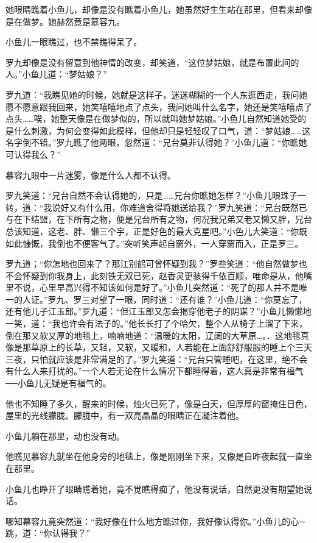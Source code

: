 \documentclass[12pt,oneside]{book}
\begin{document}
她眼睛瞧着小鱼儿，却像是没有瞧着小鱼儿，她虽然好生生站在那里，但看来却像是在做梦。她赫然竟是慕容九。

小鱼儿一眼瞧过，也不禁瞧得呆了。

罗九却像是没有留意到他神情的改变，却笑道，``这位梦姑娘，就是布置此间的人。''小鱼儿道：``梦姑娘？''

罗九道：``我瞧见她的时候，她就是这样子，迷迷糊糊的一个人东逛西走，我问她愿不愿意跟我回来，她笑嘻嘻地点了点头，我问她叫什么名字，她还是笑嘻嘻点了点头\ldots\ldots 唉，她整天像是在做梦似的，所以就叫她梦姑娘。''小鱼儿自然知道她受的是什么刺激，为何会变得如此模样，但他却只是轻轻叹了口气，道：``梦姑娘\ldots\ldots 这名字倒不错。''罗九瞧了他两眼，忽然道：``兄台莫非认得她？''小鱼儿道：``你瞧她可认得我么？''

慕容九眼中一片迷雾，像是什么人都不认得。

罗九笑道：``兄台自然不会认得她的，只是\ldots\ldots 兄台你瞧她怎样？''小鱼儿眼珠子一转，道：``我说好又有什么用，你难道舍得将她送给我？''罗九笑道：``兄台既然已与在下结盟，在下所有之物，便是兄台所有之物，何况我兄弟又老又懒又胖，兄台总该知道，这老、胖、懒三个宇，正是好色的最大克星吧。''小色儿大笑道：``你既如此慷慨，我倒也不便客气了。''突听笑声起自窗外，一人穿窗而入，正是罗三。

罗九道；``你怎地也回来了？那江别鹤可曾怀疑到我？''罗叁笑道：``他自然做梦也不会怀疑到你我身上，此刻铁无双已死，赵香灵更骇得千依百顺，唯命是从，他嘴里不说，心里早高兴得不知该如何是好了。''小鱼儿突然道：``死了的那人并不是唯一的人证。''罗九、罗三对望了一眼，同时道：``还有谁？''小鱼儿道：``你莫忘了，还有他儿子江玉郎。''罗九道：``但江玉郎又怎会揭穿他老子的阴谋？''小鱼儿懒懒地一笑，道：``我也许会有法子的。''他长长打了个哈欠，整个人从椅子上溜了下来，倒在那又软又厚的地毯上，喃喃地道：``温暖的太阳，辽阔的大草原\ldots。．这地毯真像是那草原上的长草，又轻，又软，又暖和，人若能在上面舒舒服服的睡上个三天三夜，只怕就应该是非常满足的了。''罗九笑道：``兄台只管睡吧，在这里，绝不会有什么人来打扰的。''一个人若无论在什么情况下都睡得着，这人真是非常有福气──小鱼儿无疑是有福气的。

他也不知睡了多久，醒来的时候，烛火已死了，像是白天，但厚厚的窗掩住日色，屋里的光线朦胧。朦胧中，有一双亮晶晶的眼睛正在凝注着他。

小鱼儿躺在那里，动也没有动。

他瞧见慕容九就坐在他身旁的地毯上，像是刚刚坐下来，又像是自昨夜起就一直坐在那里。

小鱼儿也睁开了眼睛瞧着她，竟不觉瞧得痴了，他没有说话，自然更没有期望她说话。

哪知幕容九竟突然道：``我好像在什么地方瞧过你，我好像认得你。''小鱼儿的心─跳，道：``你认得我？''
\end{document}
